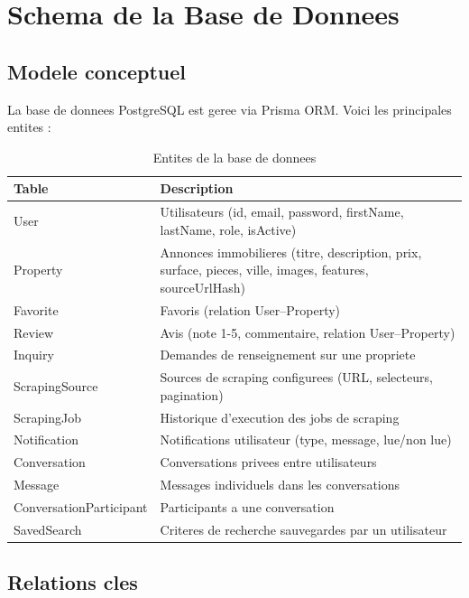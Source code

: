 \documentclass[12pt,a4paper]{report}
\begin{document}
\chapter{Schema de la Base de Donnees}

\section{Modele conceptuel}

La base de donnees PostgreSQL est geree via Prisma ORM. Voici les principales entites :

\begin{table}[H]
\centering
\begin{tabular}{|l|p{8cm}|}
\hline
\textbf{Table} & \textbf{Description} \\
\hline
User & Utilisateurs (id, email, password, firstName, lastName, role, isActive) \\
\hline
Property & Annonces immobilieres (titre, description, prix, surface, pieces, ville, images, features, sourceUrlHash) \\
\hline
Favorite & Favoris (relation User--Property) \\
\hline
Review & Avis (note 1-5, commentaire, relation User--Property) \\
\hline
Inquiry & Demandes de renseignement sur une propriete \\
\hline
ScrapingSource & Sources de scraping configurees (URL, selecteurs, pagination) \\
\hline
ScrapingJob & Historique d'execution des jobs de scraping \\
\hline
Notification & Notifications utilisateur (type, message, lue/non lue) \\
\hline
Conversation & Conversations privees entre utilisateurs \\
\hline
Message & Messages individuels dans les conversations \\
\hline
ConversationParticipant & Participants a une conversation \\
\hline
SavedSearch & Criteres de recherche sauvegardes par un utilisateur \\
\hline
\end{tabular}
\caption{Entites de la base de donnees}
\end{table}

\section{Relations cles}
\end{document}
